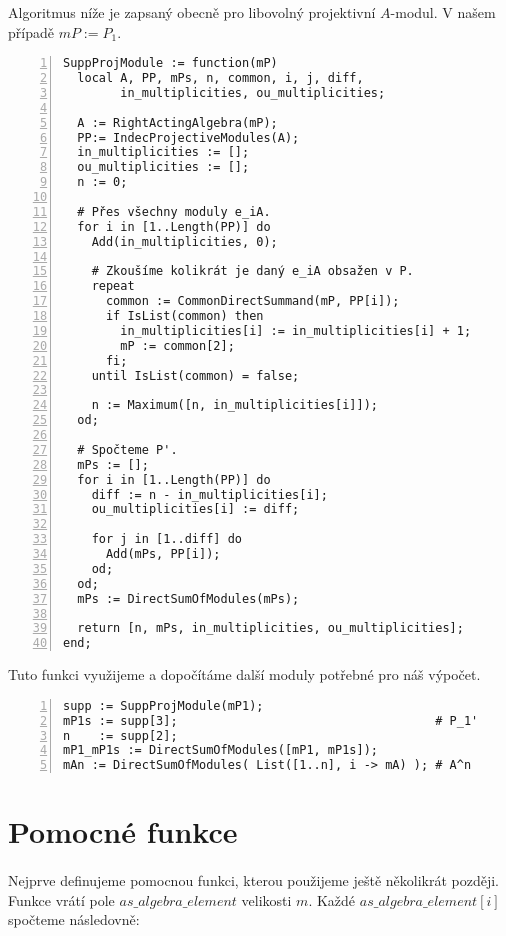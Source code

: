       Algoritmus níže je zapsaný obecně pro libovolný projektivní $A$-modul. V našem 
      případě $mP:=P_1$.
        
      \begin{Verbatim}[frame=single,numbers=left]
SuppProjModule := function(mP)
  local A, PP, mPs, n, common, i, j, diff,
        in_multiplicities, ou_multiplicities;

  A := RightActingAlgebra(mP);
  PP:= IndecProjectiveModules(A);
  in_multiplicities := [];
  ou_multiplicities := [];
  n := 0;

  # Přes všechny moduly e_iA.
  for i in [1..Length(PP)] do
    Add(in_multiplicities, 0);

    # Zkoušíme kolikrát je daný e_iA obsažen v P.
    repeat
      common := CommonDirectSummand(mP, PP[i]);
      if IsList(common) then
        in_multiplicities[i] := in_multiplicities[i] + 1;
        mP := common[2];
      fi;
    until IsList(common) = false;

    n := Maximum([n, in_multiplicities[i]]);
  od;

  # Spočteme P'.
  mPs := [];
  for i in [1..Length(PP)] do
    diff := n - in_multiplicities[i];
    ou_multiplicities[i] := diff;

    for j in [1..diff] do
      Add(mPs, PP[i]);
    od;
  od;
  mPs := DirectSumOfModules(mPs);

  return [n, mPs, in_multiplicities, ou_multiplicities];
end;  
      \end{Verbatim}      
      Tuto funkci využijeme a dopočítáme další moduly potřebné pro náš výpočet.
      
      \begin{Verbatim}[frame=single,numbers=left]
supp := SuppProjModule(mP1);
mP1s := supp[3];                                    # P_1'
n    := supp[2];
mP1_mP1s := DirectSumOfModules([mP1, mP1s]);           
mAn := DirectSumOfModules( List([1..n], i -> mA) ); # A^n  
      \end{Verbatim}
      
      
  \section{Pomocné funkce}\label{alg-opposite}
 
          \paragraph{ } Nejprve definujeme pomocnou funkci, kterou použijeme 
          ještě několikrát později. Funkce vrátí
          pole $as\_algebra\_element$ velikosti $m$. Každé $as\_algebra\_element[i]$ spočteme následovně:
          
